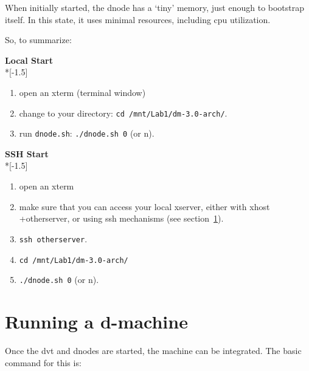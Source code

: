 \documentclass[12pt]{article}
\begin{document}
When initially started, the dnode has a `tiny' memory, just enough to
bootstrap itself. In this state, it uses minimal resources, including
cpu utilization.

\pagebreak[3]
So, to summarize:\nopagebreak

\textbf{Local Start}\\*[-1.5\baselineskip]
\begin{enumerate}
  \item open an xterm (terminal window)
  \item change to your directory: \verb$cd /mnt/Lab1/dm-3.0-arch/$.
  \item run \texttt{dnode.sh}: \verb$./dnode.sh 0$ (or n). 
\end{enumerate}

\textbf{SSH Start}\\*[-1.5\baselineskip]
\begin{enumerate}
  \item open an xterm
  \item make sure that you can access your local xserver, either with
  xhost +otherserver, or using ssh mechanisms (see section~\ref{sec:run}).
  \item \verb$ssh otherserver$.
  \item \verb$cd /mnt/Lab1/dm-3.0-arch/$
  \item \verb$./dnode.sh 0$ (or n).
\end{enumerate}


\section{Running a d-machine}
\label{sec:run}

Once the dvt and dnodes are started, the machine can be
integrated. The basic command for this is:
\end{document}
